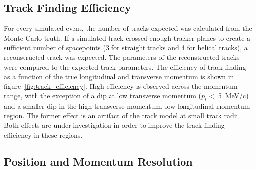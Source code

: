   \subsection{Track Finding Efficiency}
  \label{sec:performance:track_finding}
  For every simulated event, the number of tracks expected was calculated from the Monte Carlo truth. If a simulated track crossed enough tracker planes to create a sufficient number of spacepoints (3 for straight tracks and 4 for helical tracks), a reconstructed track was expected. The parameters of the reconstructed tracks were compared to the expected track parameters. The efficiency of track finding as a function of the true longitudinal and transverse momentum is shown in figure~\ref{fig:track_efficiency}. High efficiency is observed across the momentum range, with the exception of a dip at low transverse momentum ($p_t <$ 5~MeV/c) and a smaller dip in the high transverse momentum, low longitudinal momentum region. The former effect is an artifact of the track model at small track radii. Both effects are under investigation in order to improve the track finding efficiency in these regions.


  \subsection{Position and Momentum Resolution}
  \label{sec:performance:resolutions}
  
  
